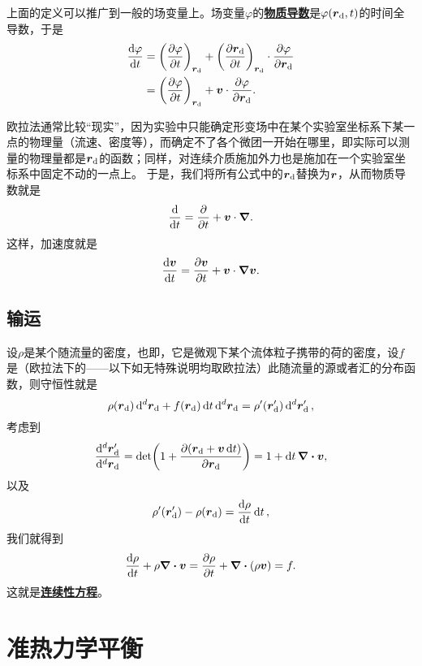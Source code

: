\documentclass[hyperref, UTF8, a4paper]{ctexart}
\newcommand{\concept}[1]{\underline{\textbf{#1}}}
\begin{document}
上面的定义可以推广到一般的场变量上。场变量$\varphi$的\concept{物质导数}是$\varphi(\vb*{r}_\text{d}, t)$的时间全导数，于是
\begin{equation}
    \begin{aligned}
        \dv{\varphi}{t} &= \left( \pdv{\varphi}{t} \right)_{\vb*{r}_\text{d}} + \left( \pdv{\vb*{r}_\text{d}}{t} \right)_{\vb*{r}_\text{d}} \cdot \pdv{\varphi}{\vb*{r}_\text{d}} \\
        &= \left( \pdv{\varphi}{t} \right)_{\vb*{r}_\text{d}} + \vb*{v} \cdot \pdv{\varphi}{\vb*{r}_\text{d}}.
    \end{aligned}
\end{equation}

欧拉法通常比较“现实”，因为实验中只能确定形变场中在某个实验室坐标系下某一点的物理量（流速、密度等），而确定不了各个微团一开始在哪里，即实际可以测量的物理量都是$\vb*{r}_\text{d}$的函数；同样，对连续介质施加外力也是施加在一个实验室坐标系中固定不动的一点上。
于是，我们将所有公式中的$\vb*{r}_\text{d}$替换为$\vb*{r}$，从而物质导数就是
\begin{equation}
    \dv{t} = \pdv{t} + \vb*{v} \cdot \grad.
\end{equation}
这样，加速度就是
\begin{equation}
    \dv{\vb*{v}}{t} = \pdv{\vb*{v}}{t} + \vb*{v} \cdot \grad{\vb*{v}}.
\end{equation}

\subsection{输运}

设$\rho$是某个随流量的密度，也即，它是微观下某个流体粒子携带的荷的密度，设$f$是（欧拉法下的——以下如无特殊说明均取欧拉法）此随流量的源或者汇的分布函数，则守恒性就是
\[
    \rho(\vb*{r}_\text{d}) \dd[d]{\vb*{r}_\text{d}} + f(\vb*{r}_\text{d}) \dd{t} \dd[d]{\vb*{r}_\text{d}} = \rho'(\vb*{r}_\text{d}') \dd[d]{\vb*{r}'_\text{d}},
\]
考虑到
\[
    \frac{\dd[d]{\vb*{r}_\text{d}'}}{\dd[d]{\vb*{r}_\text{d}}} = \det( 1 + \pdv{(\vb*{r}_\text{d} + \vb*{v} \dd{t})}{\vb*{r}_\text{d}} ) = 1 + \dd{t} \div{\vb*{v}},
\]
以及
\[
    \rho'(\vb*{r}_\text{d}') - \rho(\vb*{r}_\text{d}) = \dv{\rho}{t} \dd{t},
\]
我们就得到
\begin{equation}
    \dv{\rho}{t} + \rho \div{\vb*{v}} = \pdv{\rho}{t} + \div{(\rho \vb*{v})} = f.
    \label{eq:transportation-eq}
\end{equation}
这就是\concept{连续性方程}。

\section{准热力学平衡}
\end{document}

